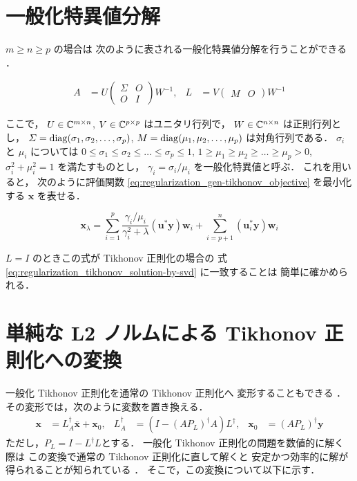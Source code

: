 \section{一般化特異値分解}

$m \ge n \ge p$ の場合は
次のように表される一般化特異値分解を行うことができる \cite{Hansen1998}．

\begin{align}
    A       & =U
    \begin{pmatrix}
        \Sigma & O \\
        O      & I
    \end{pmatrix}
    W^{-1}, &
    L       & =V
    \begin{pmatrix}
        M & O
    \end{pmatrix}
    W^{-1}
\end{align}

ここで，
$U \in \mathbb{C}^{m \times n}$,
$V \in \mathbb{C}^{p \times p}$
はユニタリ行列で，
$W \in \mathbb{C}^{n \times n}$
は正則行列とし，
$\varSigma = \operatorname{diag}(\sigma_1, \sigma_2, \ldots, \sigma_p)$,
$M = \operatorname{diag}(\mu_1, \mu_2, \ldots, \mu_p)$
は対角行列である．
$\sigma_i$ と $\mu_i$ については
$0 \le \sigma_1 \le \sigma_2 \le \ldots \le \sigma_p \le 1$,
$1 \ge \mu_1 \ge \mu_2 \ge \ldots \ge \mu_p > 0$,
$\sigma_i^2 + \mu_i^2 = 1$
を満たすものとし，
$\gamma_i = \sigma_i / \mu_i$
を一般化特異値と呼ぶ．
これを用いると，
次のように評価関数 \eqref{eq:regularization_gen-tikhonov_objective} を最小化する
$\bm{x}$ を表せる\cite{Hansen1998}．

\begin{equation}
    \bm{x}_\lambda =
    \sum_{i=1}^{p} \frac{\gamma_i / \mu_i}{\gamma_i^2+\lambda}
    (\bm{u}^*\bm{y}) \bm{w}_i
    +\sum_{i=p+1}^n (\bm{u}_i^*\bm{y}) \bm{w}_i
\end{equation}

$L=I$ のときこの式が Tikhonov 正則化の場合の
式 \eqref{eq:regularization_tikhonov_solution-by-svd} に一致することは
簡単に確かめられる．

\section{単純な L2 ノルムによる Tikhonov 正則化への変換}

一般化 Tikhonov 正則化を通常の Tikhonov 正則化へ
変形することもできる \cite{Hansen1998}．
その変形では，次のように変数を置き換える．
\begin{align}
    \bm{x}      & = L_A^\dagger \bar{\bm{x}} + \bm{x}_0,                     &
    L_A^\dagger & = \left(I - \left(A P_L\right)^\dagger A\right) L^\dagger, &
    \bm{x}_0    & = \left(A P_L\right)^\dagger \bm{y}
    \label{eq:regularization_gen-tikhonov_change-of-variables}
\end{align}
ただし，$P_L = I - L^\dagger L$とする．
一般化 Tikhonov 正則化の問題を数値的に解く際は
この変換で通常の Tikhonov 正則化に直して解くと
安定かつ効率的に解が得られることが知られている \cite{Hansen1998}．
そこで，この変換について以下に示す．

